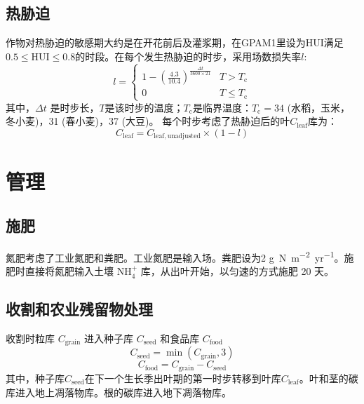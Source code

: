 \subsection{热胁迫}
作物对热胁迫的敏感期大约是在开花前后及灌浆期，在GPAM1里设为${\mathrm {HUI}} $满足$0.5 \leqslant {\mathrm {HUI}} \leqslant 0.8$的时段。在每个发生热胁迫的时步，采用场数损失率$l$:
\begin{equation}
  l=\left\{\begin{array}{cc}1-\left(\frac{4.3}{10.4}\right)^{\frac{\Delta t}{3600\times 21}} & T>T_{\mathrm{c}} \\ 0 & T \leqslant T_{\mathrm{c}}\end{array}\right.
\end{equation}
其中，$\Delta t$ 是时步长，$T$是该时步的温度；$T_{\mathrm {c}} $是临界温度：$T_{\mathrm {c}} =34$ \textcelsius (水稻，玉米，冬小麦)，31 \textcelsius (春小麦)，37 \textcelsius (大豆)。
每个时步考虑了热胁迫后的叶$C_{\mathrm{leaf}}$库为：
\begin{equation}
  C_{\mathrm{leaf}}=C_{\mathrm{leaf,  {unadjusted}}} \times (1-l)
\end{equation}


\section{管理}
\subsection{施肥}
氮肥考虑了工业氮肥和粪肥。工业氮肥是输入场。粪肥设为2 \unit{g.N.m^{−2}.yr^{−1}}。施肥时直接将氮肥输入土壤 $\mathrm{NH_4^+}$ 库，从出叶开始，以匀速的方式施肥 20 天。

\subsection{收割和农业残留物处理}
收割时粒库 $C_{\mathrm{grain}}$ 进入种子库 $C_{\mathrm{seed}}$ 和食品库 $C_{\mathrm{food}}$
\begin{equation}
  C_{\mathrm{seed}}=\min \left(C_{\mathrm{grain}}, 3\right)
\end{equation}
\begin{equation}
  C_{\mathrm{food}}=C_{\mathrm{grain}}-C_{\mathrm{seed}}
\end{equation}
其中，种子库$C_{\mathrm{seed}}$在下一个生长季出叶期的第一时步转移到叶库$C_{\mathrm{leaf}}$。叶和茎的碳库进入地上凋落物库。根的碳库进入地下凋落物库。

